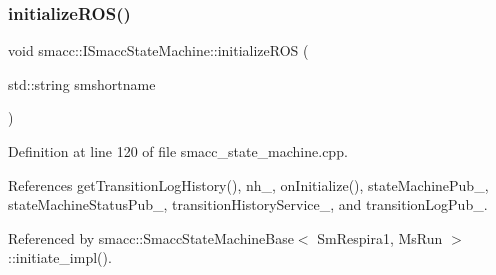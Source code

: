 \subsubsection{\texorpdfstring{initialize\+R\+O\+S()}{initializeROS()}}
{\footnotesize\ttfamily void smacc\+::\+I\+Smacc\+State\+Machine\+::initialize\+R\+OS (\begin{DoxyParamCaption}\item[{std\+::string}]{smshortname }\end{DoxyParamCaption})\hspace{0.3cm}{\ttfamily [protected]}}



Definition at line 120 of file smacc\+\_\+state\+\_\+machine.\+cpp.



References get\+Transition\+Log\+History(), nh\+\_\+, on\+Initialize(), state\+Machine\+Pub\+\_\+, state\+Machine\+Status\+Pub\+\_\+, transition\+History\+Service\+\_\+, and transition\+Log\+Pub\+\_\+.



Referenced by smacc\+::\+Smacc\+State\+Machine\+Base$<$ Sm\+Respira1, Ms\+Run $>$\+::initiate\+\_\+impl().


